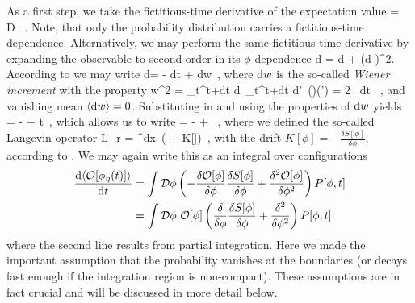 \documentclass[../main.tex]{subfiles}
\begin{document}
As a first step, we take the fictitious-time derivative of the expectation value
%
  \bea
  \label{Eq:PhiAvgSide}
   = \int \mathcal D\phi\  \CO[\phi].
\eea
%
Note, that only the probability distribution carries a fictitious-time dependence. Alternatively, we may perform the same fictitious-time derivative by expanding the observable to second order in its $\phi$ dependence
%
\beq
  \label{Eq:obs_expansion}
  {\rm d} \CO[\phi] = \frac{\delta \CO[\phi]}{\delta\phi} {\rm d} \phi +   ({\rm d} \phi)^2.
\eeq
%
According to  we may write
%
\beq
  \label{Eq:LEdiff}
  {\rm d}\phi = - {\rm d}t + {\rm d}w\, ,
\eeq
%
where ${\rm d}w$ is the so-called {\it Wiener increment} with the property
%
\beq
  w^2 \rangle = \int_{t}^{t+dt} {\rm d}\tau\ \int_{t}^{t+dt} {\rm d}\tau'\ \langle \eta(\tau)\eta(\tau') \rangle = 2 \, {\rm d}t \, ,
\eeq
%
and vanishing mean $\langle{\rm d}w\rangle = 0$.
Substituting in  and using the properties of ${\rm d}w$ yields
\bea
   \CO[\phi] \rangle = \left\langle  -\frac{\delta \CO[\phi]}{\delta\phi} +   \right{}t\, ,
\eea
%
which allows us to write
%
\beq
   =
  \left\langle  -\frac{\delta \CO[\phi]}{\delta\phi} +   \right\rangle
  \equiv {}\, ,
\eeq
%
where we defined the so-called Langevin operator
%
\beq
  L_{r} = ^dx\ \left(\frac{\delta}{\delta\phi} + K[\phi]\right)\frac{\delta}{\delta\phi}\, ,
\eeq
%
with the drift $K[\phi] = -\frac{\delta S[\phi]}{\delta\phi}$, according to . We may again write this as an integral over configurations
%
\begin{align}
  \frac{{\rm d}  \langle {\mathcal O} [\phi_\eta(t)] \rangle}{{\rm d} t} &= \int \mathcal D \phi \left( -\frac{\delta {\mathcal O}[\phi]}{\delta\phi}\frac{\delta S[\phi]}{\delta\phi} + \frac{\delta^2 {\mathcal O}[\phi]}{\delta\phi^2}\right)P[\phi,t] \\
  &= \int \mathcal D\phi \ {\mathcal O}[\phi] \left(\frac{\delta}{\delta \phi}\frac{\delta S[\phi]}{\delta \phi}  + \frac{\delta^{2}}{\delta \phi ^{2}}\right) P[\phi,t].
\end{align}
%
where the second line results from partial integration. Here we made the important assumption that the probability vanishes at the boundaries (or decays fast enough if the integration region is non-compact). These assumptions are in fact crucial and will be discussed in more detail below.
\end{document}
